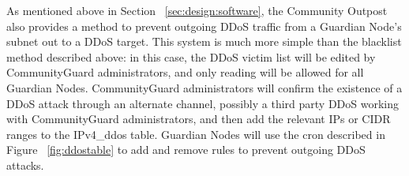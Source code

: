 As mentioned above in Section ~\ref{sec:design:software}, the Community Outpost also provides a method to prevent outgoing DDoS traffic from a Guardian Node's subnet out to a DDoS target. This system is much more simple than the blacklist method described above: in this case, the DDoS victim list will be edited by CommunityGuard administrators, and only reading will be allowed for all Guardian Nodes. CommunityGuard administrators will confirm the existence of a DDoS attack through an alternate channel, possibly a third party DDoS \cite{DDoSPreventionTools} working with CommunityGuard administrators, and then add the relevant IPs or CIDR ranges to the IPv4_ddos table. Guardian Nodes will use the cron described in Figure ~\ref{fig:ddostable} to add and remove rules to prevent outgoing DDoS attacks.